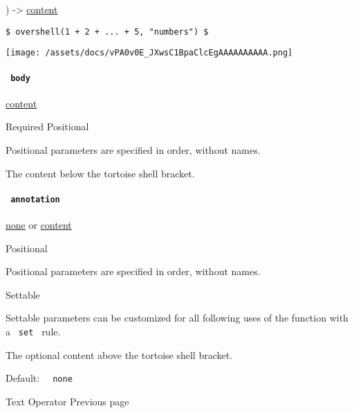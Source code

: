 ) -\textgreater{} \href{/docs/reference/foundations/content/}{content}

\begin{verbatim}
$ overshell(1 + 2 + ... + 5, "numbers") $
\end{verbatim}

\texttt{[image: /assets/docs/vPA0v0E\_JXwsC1BpaClcEgAAAAAAAAAA.png]}

\paragraph{\texorpdfstring{\texttt{\ body\ }}{ body }}\label{functions-overshell-body}

\href{/docs/reference/foundations/content/}{content}

{Required} {{ Positional }}

\label{functions-overshell-body-positional-tooltip}
Positional parameters are specified in order, without names.

The content below the tortoise shell bracket.

\paragraph{\texorpdfstring{\texttt{\ annotation\ }}{ annotation }}\label{functions-overshell-annotation}

\href{/docs/reference/foundations/none/}{none} {or}
\href{/docs/reference/foundations/content/}{content}

{{ Positional }}

\label{functions-overshell-annotation-positional-tooltip}
Positional parameters are specified in order, without names.

{{ Settable }}

\label{functions-overshell-annotation-settable-tooltip}
Settable parameters can be customized for all following uses of the
function with a \texttt{\ set\ } rule.

The optional content above the tortoise shell bracket.

Default: \texttt{\ }{\texttt{\ none\ }}\texttt{\ }

\href{/docs/reference/math/op/}{\pandocbounded{}}

{ Text Operator } { Previous page }

\href{/docs/reference/math/variants/}{\pandocbounded{}}

